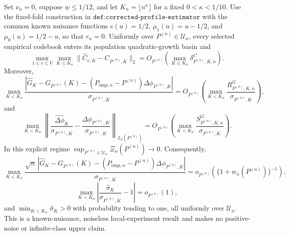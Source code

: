 Set \(\nu_n=0\), suppose \(\underline w\leq1/12\), and let \(K_n=\lfloor n^\kappa\rfloor\) for a fixed \(0<\kappa<1/10\).  Use the fixed-fold construction in \(\texttt{def:corrected-profile-estimator}\) with the common known nuisance functions \(e(u)=1/2\), \(\mu_1(u)=u-1/2\), and \(\mu_0(u)=1/2-u\), so that \(r_n=0\).  Uniformly over \(P^{(n)}\in\mathcal U_n\), every selected empirical codebook enters its population quadratic-growth basin and
\[
 \max_{1\leq v\leq V}\max_{K\leq K_n}\|\widehat C_{v,K}-C_{P^{(n)},K}\|_2
 =O_{P^{(n)}}\!\left(\max_{K\leq K_n}\delta^C_{P^{(n)},K,n}\right).
\]
Moreover,
\[
 \max_{K<K_n}\frac{|\widehat G_K-G_{P^{(n)}}(K)-(P_{\mathrm{emp},n}-P^{(n)})\Delta\phi_{P^{(n)},K}|}{\sigma_{P^{(n)},K}}
 =O_{P^{(n)}}\!\left(\max_{K<K_n}\frac{R^G_{P^{(n)},K,n}}{\sigma_{P^{(n)},K}}\right),
\]
and
\[
 \max_{K<K_n}\left\|
 \frac{\widehat{\Delta\phi}_{K}}{\sigma_{P^{(n)},K}}-
 \frac{\Delta\phi_{P^{(n)},K}}{\sigma_{P^{(n)},K}}
 \right\|_{L_2(P^{(n)})}
 =O_{P^{(n)}}\!\left(\max_{K<K_n}\frac{S^G_{P^{(n)},K,n}}{\sigma_{P^{(n)},K}}\right).
\]
In this explicit regime \(\sup_{P^{(n)}\in\mathcal U_n}\Xi_n(P^{(n)})\to0\).  Consequently,
\[
 \max_{K<K_n}\frac{\sqrt n\,|\widehat G_K-G_{P^{(n)}}(K)-(P_{\mathrm{emp},n}-P^{(n)})\Delta\phi_{P^{(n)},K}|}{\sigma_{P^{(n)},K}}
 =o_{P^{(n)}}\!\left(\{1+w_n(P^{(n)})\}^{-1}\right),
\]
\[
 \max_{K<K_n}\left|\frac{\widehat\sigma_K}{\sigma_{P^{(n)},K}}-1\right|=o_{P^{(n)}}(1),
\]
and \(\min_{K<K_n}\widehat\sigma_K>0\) with probability tending to one, all uniformly over \(\mathcal U_n\).  This is a known-nuisance, noiseless local-experiment result and makes no positive-noise or infinite-class upper claim.